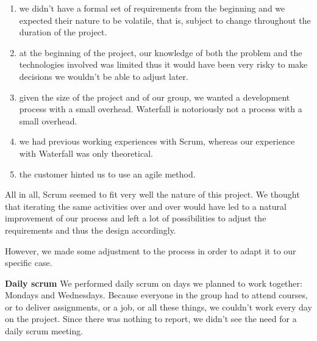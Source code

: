 \begin{enumerate}
\item we didn't have a formal set of requirements from the beginning and we expected their nature to be volatile, that is, subject to change throughout the duration of the project.


\item at the beginning of the project, our knowledge of both the problem and the technologies involved was limited thus it would have been very risky to make decisions we wouldn't be able to adjust later.

\item given the size of the project and of our group, we wanted a development process with a small overhead. Waterfall is notoriously not a process with a small overhead.

\item we had previous working experiences with Scrum, whereas our experience with Waterfall was only theoretical.

\item the customer hinted us to use an agile method.

\end{enumerate}

All in all, Scrum seemed to fit very well the nature of this project.
We thought that iterating the same activities over and over would have led to a natural improvement of our process and left a lot of possibilities to adjust the requirements and thus the design accordingly.

However, we made some adjustment to the process in order to adapt it to our specific case.

\textbf{Daily scrum}\newline
We performed daily scrum on days we planned to work together: Mondays and Wednesdays.
Because everyone in the group had to attend courses, or to deliver assignments, or a job, or all these things, we couldn't work every day on the project. 
Since there was nothing to report, we didn't see the need for a daily scrum meeting.

